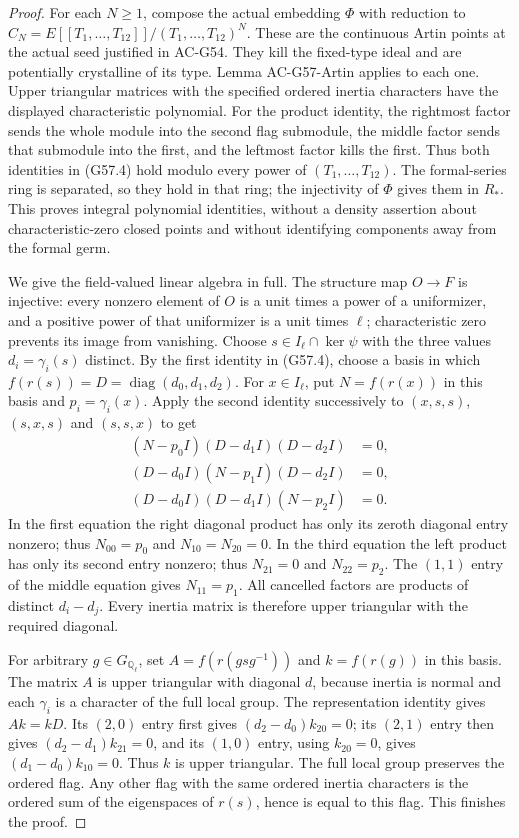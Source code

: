 \begin{proof}
For each $N\geq1$, compose the actual embedding
$\Phi$ with reduction to
$C_N=E[[T_1,\ldots,T_{12}]]/(T_1,\ldots,T_{12})^N$.
These are the continuous Artin points at the actual
seed justified in AC-G54.  They kill the fixed-type
ideal and are potentially crystalline of its type.
Lemma AC-G57-Artin applies to each one.
Upper triangular matrices with the specified
ordered inertia characters have the displayed
characteristic polynomial.  For the product identity,
the rightmost factor sends the whole module into the
second flag submodule, the middle factor sends that
submodule into the first, and the leftmost factor
kills the first.  Thus both identities in (G57.4)
hold modulo every power of $(T_1,\ldots,T_{12})$.
The formal-series ring is separated, so they hold
in that ring; the injectivity of $\Phi$ gives them
in $R_*$.  This proves integral polynomial identities,
without a density assertion about characteristic-zero
closed points and without identifying components away
from the formal germ.

We give the field-valued linear algebra in full.
The structure map $O\to F$ is injective: every
nonzero element of $O$ is a unit times a power of
a uniformizer, and a positive power of that
uniformizer is a unit times $\ell$; characteristic
zero prevents its image from vanishing.
Choose $s\in I_\ell\cap\ker\psi$ with the
three values $d_i=\gamma_i(s)$ distinct.
By the first identity in (G57.4), choose a basis in
which $f(r(s))=D=\operatorname{diag}(d_0,d_1,d_2)$.
For $x\in I_\ell$, put $N=f(r(x))$ in this basis
and $p_i=\gamma_i(x)$.
Apply the second identity successively to
$(x,s,s)$, $(s,x,s)$ and $(s,s,x)$ to get
\[
\begin{split}
 (N-p_0I)(D-d_1I)(D-d_2I)&=0,\\
 (D-d_0I)(N-p_1I)(D-d_2I)&=0,\\
 (D-d_0I)(D-d_1I)(N-p_2I)&=0.
\end{split}\tag{G57.5}
\]
In the first equation the right diagonal product has
only its zeroth diagonal entry nonzero; thus
$N_{00}=p_0$ and $N_{10}=N_{20}=0$.
In the third equation the left product has only
its second entry nonzero; thus $N_{21}=0$ and
$N_{22}=p_2$.  The $(1,1)$ entry of the middle
equation gives $N_{11}=p_1$.
All cancelled factors are products of distinct
$d_i-d_j$.  Every inertia matrix is therefore
upper triangular with the required diagonal.

For arbitrary $g\in G_{\mathbb Q_\ell}$, set
$A=f(r(gsg^{-1}))$ and $k=f(r(g))$ in this basis.
The matrix $A$ is upper triangular with diagonal
$d$, because inertia is normal and each $\gamma_i$
is a character of the full local group.
The representation identity gives $Ak=kD$.
Its $(2,0)$ entry first gives
$(d_2-d_0)k_{20}=0$; its $(2,1)$ entry then gives
$(d_2-d_1)k_{21}=0$, and its $(1,0)$ entry,
using $k_{20}=0$, gives
$(d_1-d_0)k_{10}=0$.
Thus $k$ is upper triangular.  The full local
group preserves the ordered flag.  Any other flag
with the same ordered inertia characters is the
ordered sum of the eigenspaces of $r(s)$, hence is
equal to this flag.  This finishes the proof.


\end{proof}

